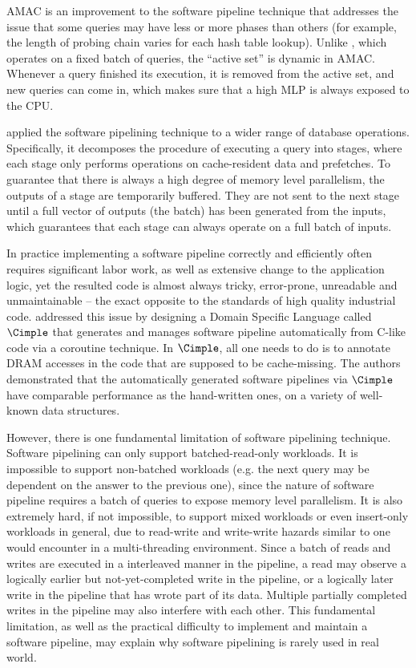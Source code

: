 \documentclass[11pt, usletter]{article}
\begin{document}
AMAC \cite{amac_vldb15} is an improvement to the software pipeline technique 
that addresses the issue that some queries may have less or more phases than others 
(for example, the length of probing chain varies for each hash table lookup). 
Unlike \cite{hashjoin_icde04}, which operates on a fixed batch of queries, the ``active set'' is dynamic in AMAC. 
Whenever a query finished its execution, it is removed from the active set, and new queries can come in, 
which makes sure that a high MLP is always exposed to the CPU.

\cite{operatorfusion_vldb17} applied the software pipelining technique to a wider range of database operations. 
Specifically, it decomposes the procedure of executing a query into stages, 
where each stage only performs operations on cache-resident data and prefetches. 
To guarantee that there is always a high degree of memory level parallelism, the outputs of a stage are temporarily buffered. 
They are not sent to the next stage until a full vector of outputs (the batch) has been generated from the inputs, 
which guarantees that each stage can always operate on a full batch of inputs.

In practice implementing a software pipeline correctly and efficiently 
often requires significant labor work, as well as extensive change to the application logic, 
yet the resulted code is almost always tricky, error-prone, unreadable and unmaintainable -- 
the exact opposite to the standards of high quality industrial code. 
\cite{cimple_pact18} addressed this issue by
designing a Domain Specific Language called $\Cimple$ that generates and manages software pipeline automatically from C-like code
via a coroutine technique. 
In $\Cimple$, all one needs to do is to annotate
DRAM accesses in the code that are supposed to be cache-missing.
The authors demonstrated that the automatically generated software pipelines via $\Cimple$ have comparable performance as the hand-written ones, 
on a variety of well-known data structures.

However, there is one fundamental limitation of software pipelining technique. 
Software pipelining can only support batched-read-only workloads. 
It is impossible to support non-batched workloads (e.g. the next query may be dependent on the answer to the previous one), 
since the nature of software pipeline requires a batch of queries to expose memory level parallelism. 
It is also extremely hard, if not impossible, to support mixed workloads or even insert-only workloads in general, 
due to read-write and write-write hazards similar to one would encounter in a multi-threading environment.
Since a batch of reads and writes are executed in a interleaved manner in the pipeline,
a read may observe a logically earlier but not-yet-completed write in the pipeline, 
or a logically later write in the pipeline that has wrote part of its data.
Multiple partially completed writes in the pipeline may also interfere with each other.
This fundamental limitation, 
as well as the practical difficulty to implement and maintain a software pipeline, 
may explain why software pipelining is rarely used in real world.
\end{document}
